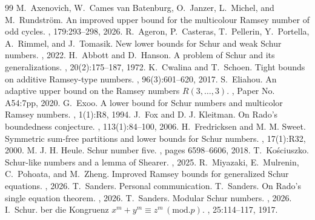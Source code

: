 \documentclass[10pt,a4paper]{amsart}
\begin{document}
\begin{thebibliography}{99}
 M.~Axenovich, W.~{Cames van Batenburg}, O.~Janzer, L.~Michel, and M.~Rundstr{\"{o}}m. \newblock An improved upper bound for the multicolour {R}amsey number of odd cycles. , 179:293--298, 2026.
 R.~Ageron, P.~Casteras, T.~Pellerin, Y.~Portella, A.~Rimmel, and J.~Tomasik. \newblock New lower bounds for {S}chur and weak {S}chur numbers. , 2022.
 H.~Abbott and D.~Hanson. \newblock A problem of {S}chur and its generalizations. , 20(2):175--187, 1972.
 K.~Cwalina and T.~Schoen. \newblock Tight bounds on additive {R}amsey-type numbers. , 96(3):601--620, 2017.
 S.~Eliahou. \newblock An adaptive upper bound on the {R}amsey numbers {$R(3, \ldots,3)$}. , Paper No. A54:7pp, 2020.
 G.~Exoo. \newblock A lower bound for {S}chur numbers and multicolor {R}amsey numbers. , 1(1):R8, 1994.
 J.~Fox and {D. J.} Kleitman. \newblock On {R}ado's boundedness conjecture. , 113(1):84--100, 2006.
 H.~Fredricksen and {M. M.} Sweet. \newblock Symmetric sum-free partitions and lower bounds for {S}chur numbers. , 17(1):R32, 2000.
 {M. J. H.} Heule. \newblock Schur number five. , pages 6598--6606, 2018.
 T.~Ko{\'{s}}ciuszko. \newblock Schur-like numbers and a lemma of {S}hearer. , 2025.
 R.~Miyazaki, E.~Mulrenin, C.~Pohoata, and M.~Zheng. \newblock Improved {R}amsey bounds for generalized {S}chur equations. , 2026.
 T.~Sanders. \newblock Personal communication.
 T.~Sanders. \newblock On {R}ado's single equation theorem. , 2026.
 T.~Sanders. \newblock Modular {S}chur numbers. , 2026.
 I.~Schur. ber die {K}ongruenz {$x^m+y^m\equiv z^m \,(\text{mod}.p)$}. , 25:114--117, 1917.

\end{thebibliography}
\end{document}
